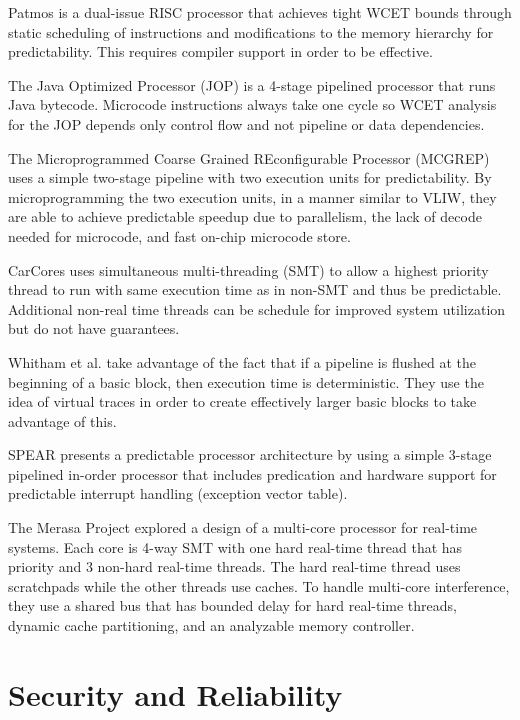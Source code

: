 Patmos \cite{patmos-ppes2011} is a dual-issue RISC processor that achieves
tight WCET bounds through static scheduling of instructions and modifications
to the memory hierarchy for predictability. This requires compiler support in
order to be effective.

The Java Optimized Processor (JOP) \cite{jop-jsa07} is a 4-stage pipelined
processor that runs Java bytecode. Microcode instructions always take one cycle
so WCET analysis for the JOP depends only control flow and not pipeline or data
dependencies.

The Microprogrammed Coarse Grained REconfigurable Processor (MCGREP)
\cite{mcgrep-rtss06} uses a simple two-stage pipeline with two execution units
for predictability. By microprogramming the two execution units, in a manner
similar to VLIW, they are able to achieve predictable speedup due to
parallelism, the lack of decode needed for microcode, and fast on-chip
microcode store. 

CarCores \cite{carcores-arcs10} uses simultaneous multi-threading (SMT) to
allow a highest priority thread to run with same execution time as in non-SMT
and thus be predictable. Additional non-real time threads can be schedule for
improved system utilization but do not have guarantees.


Whitham et al. \cite{whitham-comp10} take advantage of the fact that if a
pipeline is flushed at the beginning of a basic block, then execution time is
deterministic. They use the idea of virtual traces in order to create
effectively larger basic blocks to take advantage of this.

SPEAR \cite{spear-ecrts03} presents a predictable processor architecture by
using a simple 3-stage pipelined in-order processor that includes predication
and hardware support for predictable interrupt handling (exception vector
table).

The Merasa Project \cite{merasa-micro10} explored a design of a multi-core
processor for real-time systems. Each core is 4-way SMT with one hard real-time
thread that has priority and 3 non-hard real-time threads. The hard real-time
thread uses scratchpads while the other threads use caches. To handle
multi-core interference, they use a shared bus that has bounded delay for hard
real-time threads, dynamic cache partitioning, and an analyzable memory
controller.

\section{Security and Reliability}
\label{sec:related_work.security}

